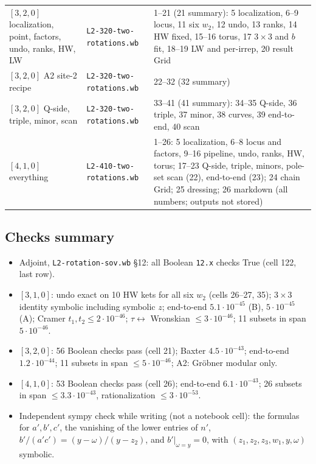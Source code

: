 \documentclass[11pt]{article}
\newcommand{\nb}[1]{\texttt{#1}}
\begin{document}
\begin{center}
\begin{longtable}{@{}p{4.7cm}p{5.1cm}p{6.3cm}@{}}
$[3,2,0]$ localization, point, factors, undo, ranks, HW, LW & \nb{L2-320-two-rotations.wb} & 1--21 (21 summary): 5 localization, 6--9 locus, 11 six $w_2$, 12 undo, 13 ranks, 14 HW fixed, 15--16 torus, 17 $3\times3$ and $b$ fit, 18--19 LW and per-irrep, 20 result Grid\\
$[3,2,0]$ A2 site-2 recipe & \nb{L2-320-two-rotations.wb} & 22--32 (32 summary)\\
$[3,2,0]$ Q-side, triple, minor, scan & \nb{L2-320-two-rotations.wb} & 33--41 (41 summary): 34--35 Q-side, 36 triple, 37 minor, 38 curves, 39 end-to-end, 40 scan\\
$[4,1,0]$ everything & \nb{L2-410-two-rotations.wb} & 1--26: 5 localization, 6--8 locus and factors, 9--16 pipeline, undo, ranks, HW, torus; 17--23 Q-side, triple, minors, pole-set scan (22), end-to-end (23); 24 chain Grid; 25 dressing; 26 markdown (all numbers; outputs not stored)\\\bottomrule
\end{longtable}
\end{center}

\subsection{Checks summary}
\begin{itemize}
\item Adjoint, \nb{L2-rotation-sov.wb} \S12: all Boolean \texttt{12.x} checks True (cell 122, last row).
\item $[3,1,0]$: undo exact on 10 HW kets for all six $w_2$ (cells 26--27, 35); $3\times3$ identity symbolic including symbolic $z$; end-to-end $5.1\cdot10^{-45}$ (B), $5\cdot10^{-45}$ (A); Cramer $t_1,t_2\le2\cdot10^{-46}$; $\tau\leftrightarrow$ Wronskian $\le3\cdot10^{-46}$; 11 subsets in span $5\cdot10^{-46}$.
\item $[3,2,0]$: 56 Boolean checks pass (cell 21); Baxter $4.5\cdot10^{-43}$; end-to-end $1.2\cdot10^{-44}$; 11 subsets in span $\le5\cdot10^{-46}$; A2: Gr\"obner modular only.
\item $[4,1,0]$: 53 Boolean checks pass (cell 26); end-to-end $6.1\cdot10^{-43}$; 26 subsets in span $\le3.3\cdot10^{-43}$, rationalization $\le3\cdot10^{-53}$.
\item Independent sympy check while writing (not a notebook cell): the formulas for $a',b',c'$, the vanishing of the lower entries of $n'$, $b'/(a'c')=(y-\omega)/(y-z_2)$, and $b'|_{\omega=y}=0$, with $(z_1,z_2,z_3,w_1,y,\omega)$ symbolic.
\end{itemize}
\end{document}
